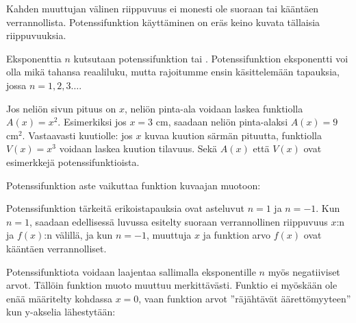 Kahden muuttujan välinen riippuvuus ei monesti ole suoraan tai kääntäen verrannollista.
Potenssifunktion käyttäminen on eräs keino kuvata tällaisia riippuvuuksia.


Eksponenttia $n$ kutsutaan potenssifunktion 
tai .
Potenssifunktion eksponentti voi olla mikä tahansa reaaliluku, mutta
rajoitumme ensin käsittelemään tapauksia, jossa $n = 1, 2, 3\ldots $.

\begin{esimerkki}
Jos neliön sivun pituus on $x$, neliön pinta-ala voidaan laskea
funktiolla $A(x)=x^2$.
Esimerkiksi jos $x = 3$ cm, saadaan neliön pinta-alaksi $A(x) = 9$ cm$^2$.
Vastaavasti kuutiolle: jos $x$ kuvaa kuution särmän pituutta, funktiolla
$V(x)=x^3$ voidaan laskea kuution tilavuus. Sekä $A(x)$ että $V(x)$ ovat
esimerkkejä potenssifunktioista.
\end{esimerkki}

Potenssifunktion aste vaikuttaa funktion kuvaajan muotoon:

\begin{center}
\begin{kuvaajapohja}{0.5}{-6}{6}{-6}{6}
\end{kuvaajapohja}
\end{center}
Potenssifunktion tärkeitä erikoistapauksia ovat asteluvut $n = 1$ ja $n = -1$.
Kun $n = 1$, saadaan edellisessä luvussa esitelty suoraan verrannollinen
riippuvuus $x$:n ja $f(x)$:n välillä, ja kun $n = -1$, muuttuja $x$ ja
funktion arvo $f(x)$ ovat kääntäen verrannolliset.

Potenssifunktiota voidaan laajentaa sallimalla eksponentille $n$
myös negatiiviset arvot.
Tällöin funktion muoto muuttuu merkittävästi. Funktio ei myöskään ole
enää määritelty kohdassa $x = 0$, vaan funktion arvot
''räjähtävät äärettömyyteen'' kun y-akselia lähestytään:

